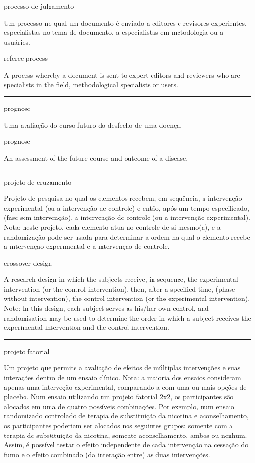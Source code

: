 \documentclass[
]{book}
\begin{document}
processo de julgamento

Um processo no qual um documento é enviado a editores e revisores experientes, especialistas no tema do documento, a especialistas em metodologia ou a usuários.

referee process

A process whereby a document is sent to expert editors and reviewers who are specialists in the field, methodological specialists or users.

\begin{center}\rule{0.5\linewidth}{0.5pt}\end{center}

prognose

Uma avaliação do curso futuro do desfecho de uma doença.

prognose

An assessment of the future course and outcome of a disease.

\begin{center}\rule{0.5\linewidth}{0.5pt}\end{center}

projeto de cruzamento

Projeto de pesquisa no qual os elementos recebem, em sequência, a intervenção experimental (ou a intervenção de controle) e então, após um tempo especificado, (fase sem intervenção), a intervenção de controle (ou a intervenção experimental). Nota: neste projeto, cada elemento atua no controle de si mesmo(a), e a randomização pode ser usada para determinar a ordem na qual o elemento recebe a intervenção experimental e a intervenção de controle.

crossover design

A research design in which the subjects receive, in sequence, the experimental intervention (or the control intervention), then, after a specified time, (phase without intervention), the control intervention (or the experimental intervention). Note: In this design, each subject serves as his/her own control, and randomisation may be used to determine the order in which a subject receives the experimental intervention and the control intervention.

\begin{center}\rule{0.5\linewidth}{0.5pt}\end{center}

projeto fatorial

Um projeto que permite a avaliação de efeitos de múltiplas intervenções e suas interações dentro de um ensaio clínico. Nota: a maioria dos ensaios consideram apenas uma interveção experimental, comparando-a com uma ou mais opções de placebo. Num ensaio utilizando um projeto fatorial 2x2, os participantes são alocados em uma de quatro possíveis combinações. Por exemplo, num ensaio randomizado controlado de terapia de substituição da nicotina e aconselhamento, os participantes poderiam ser alocados nos seguintes grupos: somente com a terapia de substituição da nicotina, somente aconselhamento, ambos ou nenhum. Assim, é possível testar o efeito independente de cada intervenção na cessação do fumo e o efeito combinado (da interação entre) as duas intervenções.
\end{document}
